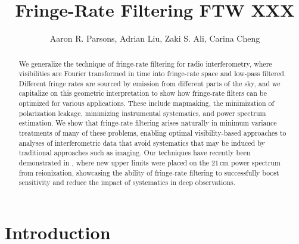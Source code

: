 \documentclass[twocolumn,apj,numberedappendix]{emulateapj}
\begin{document}
\title{Fringe-Rate Filtering FTW XXX}

\author{
Aaron R. Parsons,
Adrian Liu,
Zaki S. Ali,
Carina Cheng
}


\begin{abstract}
We generalize the technique of fringe-rate filtering for radio interferometry, where visibilities 
are Fourier transformed in time into fringe-rate space and low-pass filtered. Different fringe rates
are sourced by emission from different parts of the sky, and we capitalize on this geometric
interpretation to show how fringe-rate filters can be optimized for various applications.
These
include mapmaking, the minimization of polarization leakage, minimizing instrumental systematics,
and power spectrum estimation. We show that fringe-rate filtering arises naturally in minimum variance
treatments of many of these problems, enabling optimal visibility-based approaches to analyses of
interferometric data that avoid systematics that may be induced by traditional approaches such as imaging. Our techniques have
recently been demonstrated in \citet{ali_et_al2015}, where new upper limits
were placed on the $21\,\textrm{cm}$ power spectrum from reionization, showcasing the ability
of fringe-rate filtering to successfully boost sensitivity and reduce the impact of systematics in
deep observations.
\end{abstract}




\section{Introduction}
\end{document}
